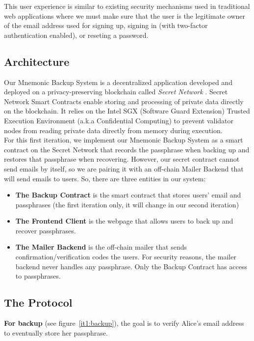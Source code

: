 \documentclass[runningheads]{llncs}
\begin{document}
This user experience is similar to existing security mechanisms used in traditional web applications where we must make sure that the user is the legitimate owner of the email address used for signing up, signing in (with two-factor authentication enabled), or reseting a password.

\subsection{Architecture}

Our Mnemonic Backup System is a decentralized application developed and deployed on a privacy-preserving blockchain called {\em Secret Network} \cite{zyskind2015decentralizing}. Secret Network Smart Contracts enable storing and processing of private data directly on the blockchain. It relies on the Intel SGX (Software Guard Extension) Trusted Execution Environment (a.k.a Confidential Computing) \cite{mckeen2013innovative} to prevent validator nodes from reading private data directly from memory during execution. \\

For this first iteration, we implement our Mnemonic Backup System as a smart contract on the Secret Network that records the passphrase when backing up and restores that passphrase when recovering. However, our secret contract cannot send emails by itself, so we are pairing it with an off-chain Mailer Backend that will send emails to users. So, there are three entities in our system:

\begin{itemize}
    \item {\bf The Backup Contract} is the smart contract that stores users' email and passphrases (the first iteration only, it will change in our second iteration)
    \item {\bf The Frontend Client} is the webpage that allows users to back up and recover passphrases.
    \item {\bf The Mailer Backend} is the off-chain mailer that sends confirmation/verification codes the users. For security reasons, the mailer backend never handles any passphrase. Only the Backup Contract has access to passphrases.
\end{itemize}

\subsection{The Protocol}

{\bf For backup} (see figure~\ref{it1:backup}), the goal is to verify Alice's email address to eventually store her passphrase. 
\end{document}

